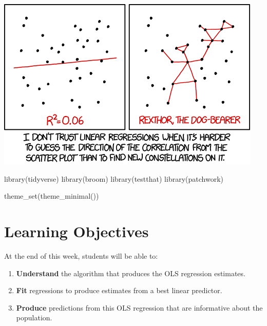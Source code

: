 \documentclass[
  letterpaper,
  DIV=11,
  numbers=noendperiod]{scrreprt}
\newenvironment{Shaded}{\begin{snugshade}}{\end{snugshade}}
\newcommand{\FunctionTok}[1]{\textcolor[rgb]{0.28,0.35,0.67}{#1}}
\newcommand{\NormalTok}[1]{\textcolor[rgb]{0.00,0.23,0.31}{#1}}
\providecommand{\tightlist}{%
  \setlength{\itemsep}{0pt}\setlength{\parskip}{0pt}}\usepackage{longtable,booktabs,array}
\begin{document}
\includegraphics{./images/linear_regression.png}

\begin{Shaded}
\begin{Highlighting}[]
\FunctionTok{library}\NormalTok{(tidyverse)}
\FunctionTok{library}\NormalTok{(broom)}
\FunctionTok{library}\NormalTok{(testthat)}
\FunctionTok{library}\NormalTok{(patchwork)}
\end{Highlighting}
\end{Shaded}

\begin{Shaded}
\begin{Highlighting}[]
\FunctionTok{theme\_set}\NormalTok{(}\FunctionTok{theme\_minimal}\NormalTok{())}
\end{Highlighting}
\end{Shaded}

\section{Learning Objectives}\label{learning-objectives-7}

At the end of this week, students will be able to:

\begin{enumerate}
\def\labelenumi{\arabic{enumi}.}
\tightlist
\item
  \textbf{Understand} the algorithm that produces the OLS regression
  estimates.
\item
  \textbf{Fit} regressions to produce estimates from a best linear
  predictor.
\item
  \textbf{Produce} predictions from this OLS regression that are
  informative about the population.
\end{enumerate}
\end{document}
